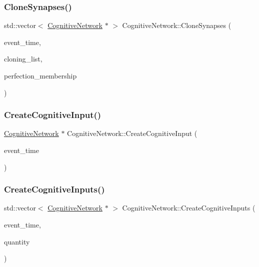 \subsubsection{\texorpdfstring{Clone\+Synapses()}{CloneSynapses()}}
{\footnotesize\ttfamily std\+::vector$<$ \mbox{\hyperlink{classCognitiveNetwork}{Cognitive\+Network}} $\ast$ $>$ Cognitive\+Network\+::\+Clone\+Synapses (\begin{DoxyParamCaption}\item[{std\+::chrono\+::time\+\_\+point$<$ \mbox{\hyperlink{universe_8h_a0ef8d951d1ca5ab3cfaf7ab4c7a6fd80}{Clock}} $>$}]{event\+\_\+time,  }\item[{std\+::vector$<$ \mbox{\hyperlink{classCognitiveNetwork}{Cognitive\+Network}} $\ast$$>$}]{cloning\+\_\+list,  }\item[{double}]{perfection\+\_\+membership }\end{DoxyParamCaption})}

\mbox{\label{classCognitiveNetwork_add96197c3dc51d94d06edb480fbc4a38}} 
\subsubsection{\texorpdfstring{Create\+Cognitive\+Input()}{CreateCognitiveInput()}}
{\footnotesize\ttfamily \mbox{\hyperlink{classCognitiveNetwork}{Cognitive\+Network}} $\ast$ Cognitive\+Network\+::\+Create\+Cognitive\+Input (\begin{DoxyParamCaption}\item[{std\+::chrono\+::time\+\_\+point$<$ \mbox{\hyperlink{universe_8h_a0ef8d951d1ca5ab3cfaf7ab4c7a6fd80}{Clock}} $>$}]{event\+\_\+time }\end{DoxyParamCaption})}

\mbox{\label{classCognitiveNetwork_a0833f7b587f14e0c0778661a56bce957}} 
\subsubsection{\texorpdfstring{Create\+Cognitive\+Inputs()}{CreateCognitiveInputs()}}
{\footnotesize\ttfamily std\+::vector$<$ \mbox{\hyperlink{classCognitiveNetwork}{Cognitive\+Network}} $\ast$ $>$ Cognitive\+Network\+::\+Create\+Cognitive\+Inputs (\begin{DoxyParamCaption}\item[{std\+::chrono\+::time\+\_\+point$<$ \mbox{\hyperlink{universe_8h_a0ef8d951d1ca5ab3cfaf7ab4c7a6fd80}{Clock}} $>$}]{event\+\_\+time,  }\item[{int}]{quantity }\end{DoxyParamCaption})}

